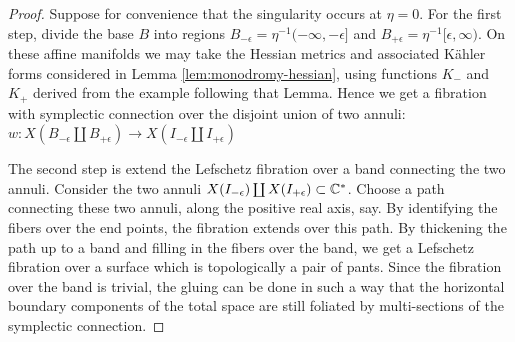 \documentclass[12pt]{amsart}
\begin{document}
\begin{proof}


Suppose for convenience that the singularity occurs at $\eta =
0$. For the first step, divide the base $B$ into regions $B_{-\epsilon}=
\eta^{-1}(-\infty,-\epsilon]$ and $B_{+\epsilon} =
\eta^{-1}[\epsilon,\infty)$. On these affine manifolds we may take the
Hessian metrics and associated K\"{a}hler forms considered in Lemma
\ref{lem:monodromy-hessian}, using functions $K_-$ and $K_+$ derived from the example following that Lemma. Hence we get a fibration with symplectic
connection over the disjoint union of two annuli: $w: X(B_{-\epsilon}
\coprod B_{+\epsilon}) \to X(I_{-\epsilon} \coprod I_{+\epsilon})$


The second step is extend the Lefschetz fibration over a band connecting the two annuli. Consider the two annuli $X(I_{-\epsilon})\coprod
X(I_{+\epsilon}) \subset \mathbb{C}^*$. Choose a path connecting these two
annuli, along the positive real axis, say. By identifying the fibers
over the end points, the fibration extends over this path. By
thickening the path up to a band and filling in the fibers over the
band, we get a Lefschetz fibration over a surface which is
topologically a pair of pants. Since the fibration over the band is trivial, the gluing can be done in such a way that the horizontal boundary components of the total space are still foliated by multi-sections of the symplectic connection.


\end{proof}
\end{document}
